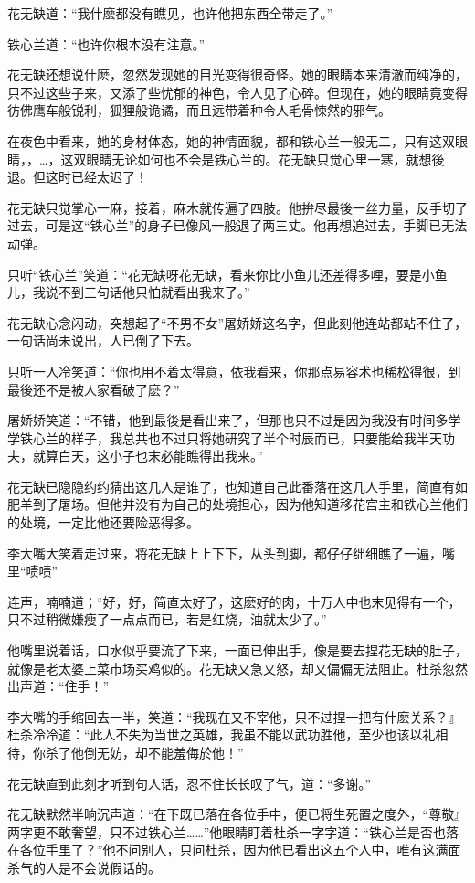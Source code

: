\documentclass[12pt,oneside]{book}
\begin{document}
花无缺道：``我什麽都没有瞧见，也许他把东西全带走了。''

铁心兰道：``也许你根本没有注意。''

花无缺还想说什麽，忽然发现她的目光变得很奇怪。她的眼睛本来清澈而纯净的，只不过这些子来，又添了些忧郁的神色，令人见了心碎。但现在，她的眼睛竟变得彷佛鹰车般锐利，狐狸般诡谲，而且远带着种令人毛骨悚然的邪气。

在夜色中看来，她的身材体态，她的神情面貌，都和铁心兰一般无二，只有这双眼睛，，\ldots，这双眼睛无论如何也不会是铁心兰的。花无缺只觉心里一寒，就想後退。但这时已经太迟了！

花无缺只觉掌心一麻，接着，麻木就传遍了四肢。他拚尽最後一丝力量，反手切了过去，可是这``铁心兰''的身子已像风一般退了两三丈。他再想追过去，手脚已无法动弹。

只听``铁心兰''笑道：``花无缺呀花无缺，看来你比小鱼儿还差得多哩，要是小鱼儿，我说不到三句话他只怕就看出我来了。''

花无缺心念闪动，突想起了``不男不女''屠娇娇这名字，但此刻他连站都站不住了，一句话尚未说出，人已倒了下去。

只听一人冷笑道：``你也用不着太得意，依我看来，你那点易容术也稀松得很，到最後还不是被人家看破了麽？''

屠娇娇笑道：``不错，他到最後是看出来了，但那也只不过是因为我没有时间多学学铁心兰的样子，我总共也不过只将她研究了半个时辰而已，只要能给我半天功夫，就算白天，这小子也末必能瞧得出我来。''

花无缺已隐隐约约猜出这几人是谁了，也知道自己此番落在这几人手里，简直有如肥羊到了屠场。但他并没有为自己的处境担心，因为他知道移花宫主和铁心兰他们的处境，一定比他还要险恶得多。

李大嘴大笑着走过来，将花无缺上上下下，从头到脚，都仔仔绌细瞧了一遍，嘴里``啧啧''

连声，喃喃道；``好，好，简直太好了，这麽好的肉，十万人中也末见得有一个，只不过稍微嫌瘦了一点点而已，若是红烧，油就太少了。''

他嘴里说着话，口水似乎要流了下来，一面已伸出手，像是要去捏花无缺的肚子，就像是老太婆上菜市场买鸡似的。花无缺又急又怒，却又偏偏无法阻止。杜杀忽然出声道：``住手！''

李大嘴的手缩回去一半，笑道：``我现在又不宰他，只不过捏一把有什麽关系？』杜杀冷冷道：``此人不失为当世之英雄，我虽不能以武功胜他，至少也该以礼相待，你杀了他倒无妨，却不能羞侮於他！''

花无缺直到此刻才听到句人话，忍不住长长叹了气，道：``多谢。''

花无缺默然半晌沉声道：``在下既已落在各位手中，便已将生死置之度外，``尊敬』两字更不敢奢望，只不过铁心兰\ldots\ldots{}''他眼睛盯着杜杀一字字道：``铁心兰是否也落在各位手里了？''他不问别人，只问杜杀，因为他已看出这五个人中，唯有这满面杀气的人是不会说假话的。
\end{document}
